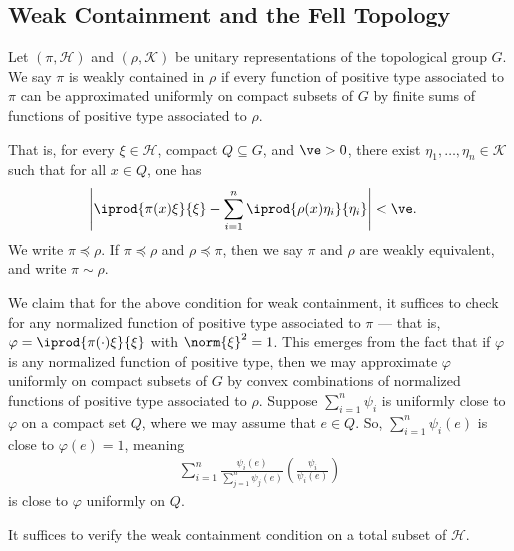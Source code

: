 \documentclass[10pt]{mypackage}
\begin{document}
\subsection{Weak Containment and the Fell Topology}%
\begin{definition}
  Let $\left( \pi,\mathscr{H} \right)$ and $\left( \rho,\mathscr{K} \right)$ be unitary representations of the topological group $G$. We say $\pi$ is weakly contained in $\rho$ if every function of positive type associated to $\pi$ can be approximated uniformly on compact subsets of $G$ by finite sums of functions of positive type associated to $\rho$.

  That is, for every $\xi\in \mathscr{H}$, compact $Q\subseteq G$, and $\ve > 0$, there exist $\eta_1,\dots,\eta_n\in \mathscr{K}$ such that for all $x\in Q$, one has
  \begin{align*}
    \left\vert \iprod{\pi(x)\xi}{\xi} - \sum_{i=1}^{n} \iprod{\rho(x)\eta_i}{\eta_i} \right\vert &< \ve.
  \end{align*}
  We write $\pi\preceq \rho$. If $\pi\preceq \rho$ and $\rho\preceq \pi$, then we say $\pi$ and $\rho$ are weakly equivalent, and write $\pi\sim \rho$.
\end{definition}
We claim that for the above condition for weak containment, it suffices to check for any normalized function of positive type associated to $\pi$ --- that is, $\varphi = \iprod{\pi(\cdot)\xi}{\xi}$ with $\norm{\xi}^2 = 1$. This emerges from the fact that if $\varphi$ is any normalized function of positive type, then we may approximate $\varphi$ uniformly on compact subsets of $G$ by convex combinations of normalized functions of positive type associated to $\rho$. Suppose $\sum_{i=1}^{n}\psi_i$ is uniformly close to $\varphi$ on a compact set $Q$, where we may assume that $e\in Q$. So, $\sum_{i=1}^{n}\psi_i(e)$ is close to $\varphi(e) = 1$, meaning
\begin{align*}
  \sum_{i=1}^{n} \frac{\psi_i(e)}{\sum_{j=1}^{n}\psi_j(e)}\left( \frac{\psi_i}{\psi_i(e)} \right)
\end{align*}
is close to $\varphi$ uniformly on $Q$.
\begin{lemma}
  It suffices to verify the weak containment condition on a total subset of $\mathscr{H}$.
\end{lemma}
\end{document}

